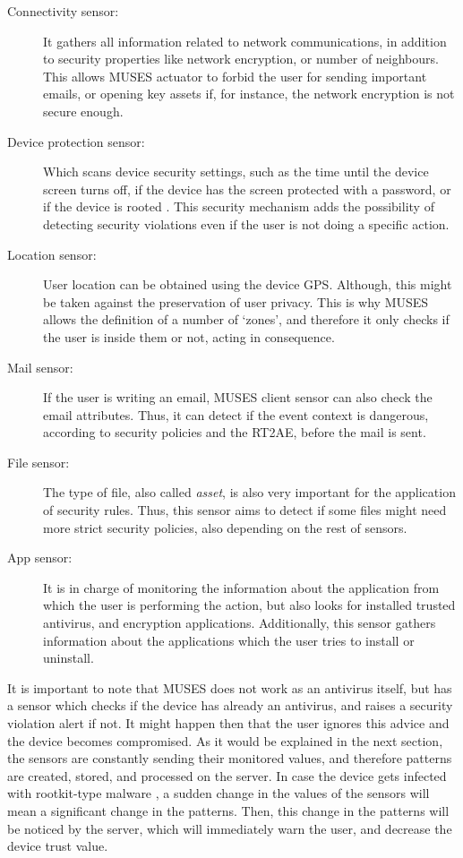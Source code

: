 \begin{description}
  \item[Connectivity sensor:] It gathers all information related to network communications, in addition to security properties like network encryption, or number of neighbours. This allows MUSES actuator to forbid the user for sending important emails, or opening key assets if, for instance, the network encryption is not secure enough. 
  \item[Device protection sensor:] Which scans device security settings, such as the time until the device screen turns off, if the device has the screen protected with a password, or if the device is rooted \cite{hildenbrand2014}. This security mechanism adds the possibility of detecting security violations even if the user is not doing a specific action.
  \item[Location sensor:] User location can be obtained using the device GPS. Although, this might be taken against the preservation of user privacy. This is why MUSES allows the definition of a number of `zones', and therefore it only checks if the user is inside them or not, acting in consequence.
  \item[Mail sensor:] If the user is writing an email, MUSES client sensor can also check the email attributes. Thus, it can detect if the event context is dangerous, according to security policies and the RT2AE, before the mail is sent.
  \item[File sensor:] The type of file, also called \textit{asset}, is also very important for the application of security rules. Thus, this sensor aims to detect if some files might need more strict security policies, also depending on the rest of sensors.
  \item[App sensor:] It is in charge of monitoring the information about the application from which the user is performing the action, but also looks for installed trusted antivirus, and encryption applications. Additionally, this sensor gathers information about the applications which the user tries to install or uninstall.
\end{description}

It is important to note that MUSES does not work as an antivirus itself, but has a sensor which checks if the device has already an antivirus, and raises a security violation alert if not. It might happen then that the user ignores this advice and the device becomes compromised. As it would be explained in the next section, the sensors are constantly sending their monitored values, and therefore patterns are created, stored, and processed on the server. In case the device gets infected with rootkit-type malware \cite{bickford2010rootkits}, a sudden change in the values of the sensors will mean a significant change in the patterns. Then, this change in the patterns will be noticed by the server, which will immediately warn the user, and decrease the device trust value.

